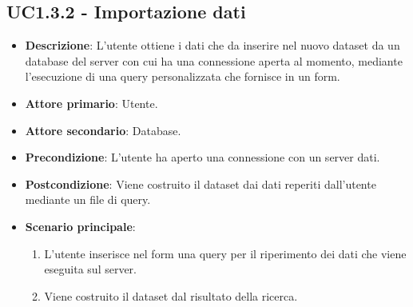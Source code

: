 \subsection{UC1.3.2 - Importazione dati}
\label{subsec:UC1.3.2}
\begin{itemize}
    \item \textbf{Descrizione}: L'utente ottiene i dati che da inserire nel nuovo dataset da un database
                                del server con cui ha una connessione aperta al momento, mediante 
                                l'esecuzione di una query personalizzata che fornisce in un form.

    \item \textbf{Attore primario}: Utente.
    
    \item \textbf{Attore secondario}: Database.
    
    \item \textbf{Precondizione}:   L'utente ha aperto una connessione con un server dati.
    \item \textbf{Postcondizione}:  Viene costruito il dataset dai dati reperiti dall'utente mediante un file di query.

	\item \textbf{Scenario principale}:
		\begin{enumerate}
			\item L'utente inserisce nel form una query per il riperimento dei dati che viene eseguita sul server.
			\item Viene costruito il dataset dal risultato della ricerca.
        \end{enumerate}

\end{itemize}







